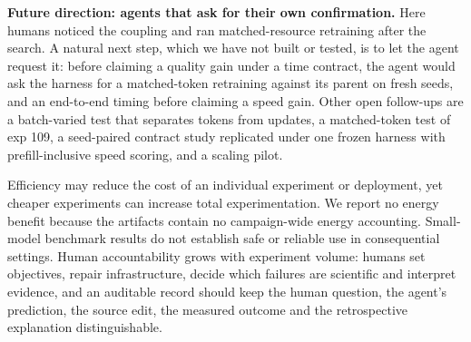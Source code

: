 \documentclass{article}
\begin{document}
\textbf{Future direction: agents that ask for their own confirmation.} Here humans noticed the coupling and ran matched-resource retraining after the search. A natural next step, which we have not built or tested, is to let the agent request it: before claiming a quality gain under a time contract, the agent would ask the harness for a matched-token retraining against its parent on fresh seeds, and an end-to-end timing before claiming a speed gain. Other open follow-ups are a batch-varied test that separates tokens from updates, a matched-token test of exp 109, a seed-paired contract study replicated under one frozen harness with prefill-inclusive speed scoring, and a scaling pilot.

Efficiency may reduce the cost of an individual experiment or deployment, yet cheaper experiments can increase total experimentation. We report no energy benefit because the artifacts contain no campaign-wide energy accounting. Small-model benchmark results do not establish safe or reliable use in consequential settings. Human accountability grows with experiment volume: humans set objectives, repair infrastructure, decide which failures are scientific and interpret evidence, and an auditable record should keep the human question, the agent's prediction, the source edit, the measured outcome and the retrospective explanation distinguishable.
\label{partthreeend}

\clearpage
\appendix
\raggedbottom
\raggedright
\setlength{\parskip}{4pt}
\end{document}
